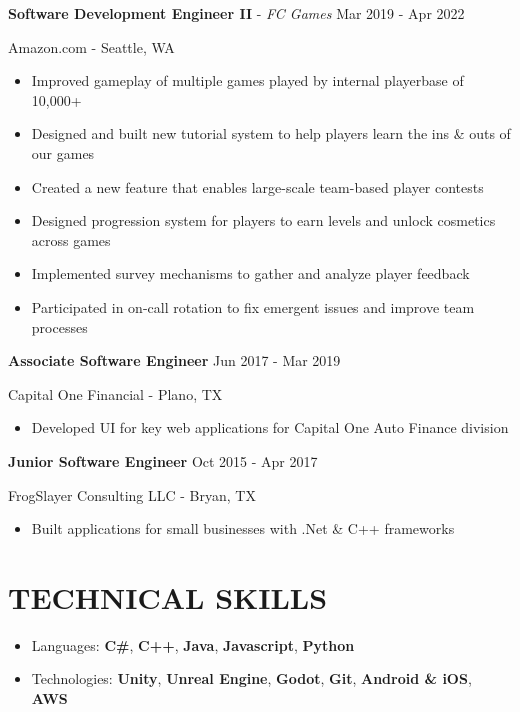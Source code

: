 \documentclass[resmargin,10pt]{res} %
\begin{document}
\begin{resume}
\begin{itemize}
    \end{itemize}
    {\bf Software Development Engineer II} - \textit{FC Games}  \hfill Mar 2019 - Apr 2022
    \begin{ncolumn}{1}
        {Amazon.com} - Seattle, WA
    \end{ncolumn}
    \begin{itemize}
        \setlength\itemsep{-0.1em}
        \item Improved gameplay of multiple games played by internal playerbase of 10,000+
        \item Designed and built new tutorial system to help players learn the ins \& outs of our games
        \item Created a new feature that enables large-scale team-based player contests
        \item Designed progression system for players to earn levels and unlock cosmetics across games
        \item Implemented survey mechanisms to gather and analyze player feedback
        \item Participated in on-call rotation to fix emergent issues and improve team processes
    \end{itemize}
    {\bf Associate Software Engineer} \hfill Jun 2017 - Mar 2019 
    \begin{ncolumn}{1}
        {Capital One Financial} - Plano, TX
    \end{ncolumn}
    \begin{itemize}
        \item Developed UI for key web applications for Capital One Auto Finance division
    \end{itemize}
    {\bf Junior Software Engineer} \hfill Oct 2015 - Apr 2017
    \begin{ncolumn}{1}
        {FrogSlayer Consulting LLC} - Bryan, TX 
    \end{ncolumn}
    \begin{itemize}
        \setlength\itemsep{-0.0em}
        \item  Built applications for small businesses with .Net \& C++ frameworks
    \end{itemize}

    \section{TECHNICAL SKILLS}
    \begin{itemize}
        \setlength\itemsep{0.1em}
        \item[] {\large Languages:} \textbf{C\#}, \textbf{C++}, \textbf{Java}, \textbf{Javascript}, \textbf{Python}
        \item[] {\large Technologies:} \textbf{Unity}, \textbf{Unreal Engine}, \textbf{Godot}, \textbf{Git}, \textbf{Android \& iOS}, \textbf{AWS}
    \end{itemize}

\end{resume}
\end{document}
